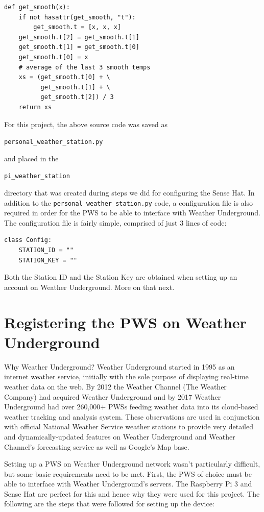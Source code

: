 \documentclass[sigconf]{acmart}
\begin{document}
\begin{verbatim}
def get_smooth(x):
    if not hasattr(get_smooth, "t"):
        get_smooth.t = [x, x, x]
    get_smooth.t[2] = get_smooth.t[1]
    get_smooth.t[1] = get_smooth.t[0]
    get_smooth.t[0] = x
    # average of the last 3 smooth temps
    xs = (get_smooth.t[0] + \
          get_smooth.t[1] + \
          get_smooth.t[2]) / 3
    return xs
\end{verbatim}


For this project, the above source code was saved as 

\verb|personal_weather_station.py| 

and placed in the 

\verb|pi_weather_station| 

 directory that was created during steps we did for configuring the Sense Hat. In addition to the \verb|personal_weather_station.py| code, a configuration file is also required in order for the PWS to be able to interface with Weather Underground. The configuration file is fairly simple, comprised of just 3 lines of code:


\begin{verbatim}
class Config:
    STATION_ID = ""
    STATION_KEY = ""
\end{verbatim}


Both the Station ID and the Station Key are obtained when setting up an account on Weather Underground. More on that next.

\section{Registering the PWS on Weather Underground}

Why Weather Underground? Weather Underground started in 1995 as an internet weather service, initially with the sole purpose of displaying real-time weather data on the web. By 2012 the Weather Channel (The Weather Company) had acquired Weather Underground and by 2017 Weather Underground had over 260,000+ PWSs feeding weather data into its cloud-based weather tracking and analysis system. These observations are used in conjunction with official National Weather Service weather stations to provide very detailed and dynamically-updated features on Weather Underground and Weather Channel's forecasting service as well as Google's Map base.

Setting up a PWS on Weather Underground network wasn't particularly difficult, but some basic requirements need to be met. First, the PWS of choice must be able to interface with Weather Underground's servers. The Raspberry Pi 3 and Sense Hat are perfect for this and hence why they were used for this project. The following are the steps that were followed for setting up the device:
\end{document}
